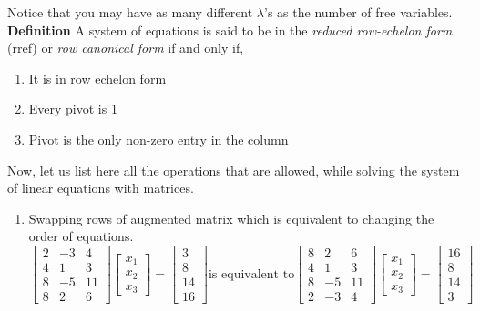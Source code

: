 \documentclass{article}
\begin{document}
Notice that you may have as many different $\lambda$'s as the number of free variables.\\

\textbf{Definition}
A system of equations is said to be in the \textit{reduced row-echelon form} (rref) or \textit{row canonical form} if and only if,
\begin{enumerate}
    \item It is in row echelon form
    \item Every pivot is 1
    \item Pivot is the only non-zero entry in the column
\end{enumerate}

Now, let us list here all the operations that are allowed, while solving the system of linear equations with matrices.
\begin{enumerate}
    \item Swapping rows of augmented matrix which is equivalent to changing the order of equations.
     \[       
        \begin{bmatrix}
           2 & -3 & 4\\
           4 & 1 & 3\\
           8 & -5 & 11\\
           8 & 2 & 6
       \end{bmatrix}
        \begin{bmatrix}
            x_1\\x_2\\x_3
        \end{bmatrix} = 
        \begin{bmatrix}
                    3\\8\\14\\16
        \end{bmatrix} \text{is equivalent to}
        \begin{bmatrix}
           8 & 2 & 6\\
           4 & 1 & 3\\
           8 & -5 & 11\\
           2 & -3 & 4
        \end{bmatrix}
        \begin{bmatrix}
            x_1\\x_2\\x_3
        \end{bmatrix} = 
        \begin{bmatrix}
            16\\8\\14\\3

\end{bmatrix}\]
\end{enumerate}
\end{document}
